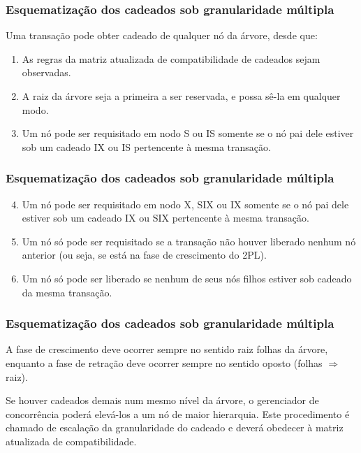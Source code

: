 \documentclass{beamer}
\begin{document}

\begin{frame}
    \frametitle{Esquematização dos cadeados sob granularidade múltipla}
    
    Uma transação pode obter cadeado de qualquer nó da árvore, desde que:

    \medskip
    \begin{enumerate}
        \item As regras da matriz atualizada de compatibilidade de cadeados sejam observadas.
        \item A raiz da árvore seja a primeira a ser reservada, e possa sê-la em qualquer modo.
        \item Um nó pode ser requisitado em nodo S ou IS somente se o nó pai dele estiver sob um cadeado IX ou IS pertencente à mesma transação.
    \end{enumerate}
\end{frame}
        
\begin{frame}
    \frametitle{Esquematização dos cadeados sob granularidade múltipla}

    \begin{enumerate}
        \setcounter{enumi}{3}
        \item Um nó pode ser requisitado em nodo X, SIX ou IX somente se o nó pai dele estiver sob um cadeado IX ou SIX pertencente à mesma transação.
        \item Um nó só pode ser requisitado se a transação não houver liberado nenhum nó anterior (ou seja, se está na fase de crescimento do 2PL).
        \item Um nó só pode ser liberado se nenhum de seus nós filhos estiver sob cadeado da mesma transação.
    \end{enumerate}
    
\end{frame}


\begin{frame}
    \frametitle{Esquematização dos cadeados sob granularidade múltipla}
    
    A fase de crescimento deve ocorrer sempre no sentido raiz \Rightarrow folhas da árvore, enquanto a fase de retração deve ocorrer sempre no sentido oposto (folhas $\Rightarrow$ raiz).

    \medskip
    Se houver cadeados demais num mesmo nível da árvore, o gerenciador de concorrência poderá elevá-los a um nó de maior hierarquia. Este procedimento é chamado de escalação da granularidade do cadeado e deverá obedecer à matriz atualizada de compatibilidade.
\end{frame}
\end{document}
